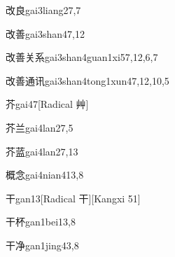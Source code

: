 
\begin{verbete}{改良}{gai3liang2}{7,7}
\end{verbete}

\begin{verbete}{改善}{gai3shan4}{7,12}
\end{verbete}

\begin{verbete}{改善关系}{gai3shan4guan1xi5}{7,12,6,7}
\end{verbete}

\begin{verbete}{改善通讯}{gai3shan4tong1xun4}{7,12,10,5}
\end{verbete}

\begin{verbete}{芥}{gai4}{7}[Radical 艸]
\end{verbete}

\begin{verbete}{芥兰}{gai4lan2}{7,5}
\end{verbete}

\begin{verbete}{芥蓝}{gai4lan2}{7,13}
\end{verbete}

\begin{verbete}{概念}{gai4nian4}{13,8}
\end{verbete}

\begin{verbete}{干}{gan1}{3}[Radical 干][Kangxi 51]
\end{verbete}

\begin{verbete}{干杯}{gan1bei1}{3,8}
\end{verbete}

\begin{verbete}{干净}{gan1jing4}{3,8}
\end{verbete}

